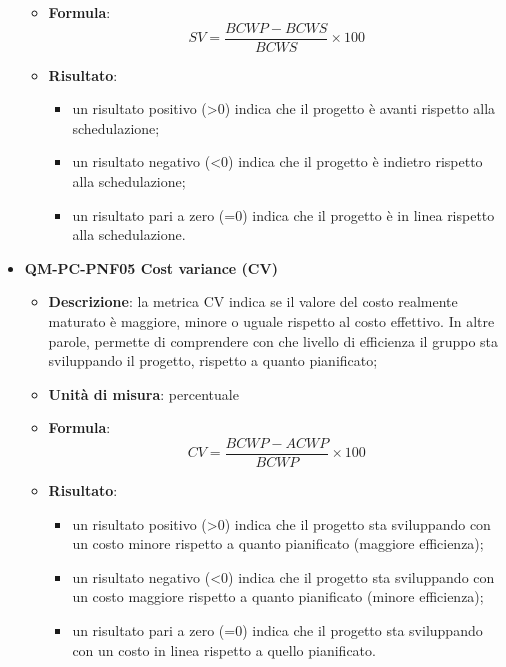 \begin{itemize}
\begin{itemize}
							\item\textbf{Formula}: \\
								\[SV = \frac{\mathit{BCWP} - \mathit{BCWS}}{\mathit{BCWS}} \times 100\]
							\item\textbf{Risultato}:
								\begin{itemize}
									\item un risultato positivo (>0) indica che il progetto è avanti rispetto alla schedulazione;
									\item un risultato negativo (<0) indica che il progetto è indietro rispetto alla schedulazione;
									\item un risultato pari a zero (=0) indica che il progetto è in linea rispetto alla schedulazione.
								\end{itemize}
						\end{itemize}
					\item\textbf{QM-PC-PNF05 Cost variance (CV)}
						\begin{itemize}
							\item\textbf{Descrizione}: la metrica CV indica se il valore del costo realmente maturato è maggiore, minore o uguale rispetto al costo effettivo. In altre parole, permette di comprendere con che livello di efficienza il gruppo sta sviluppando il progetto, rispetto a quanto pianificato;
							\item\textbf{Unità di misura}: percentuale
							\item\textbf{Formula}: \\
								\[CV = \frac{\mathit{BCWP} - \mathit{ACWP}}{\mathit{BCWP}} \times 100\]
							\item\textbf{Risultato}:
								\begin{itemize}
									\item un risultato positivo (>0) indica che il progetto sta sviluppando con un costo minore rispetto a quanto pianificato (maggiore efficienza);
									\item un risultato negativo (<0) indica che il progetto sta sviluppando con un costo maggiore rispetto a quanto pianificato (minore efficienza);
									\item un risultato pari a zero (=0) indica che il progetto sta sviluppando con un costo in linea rispetto a quello pianificato.
								\end{itemize}
						\end{itemize}
				\end{itemize}

